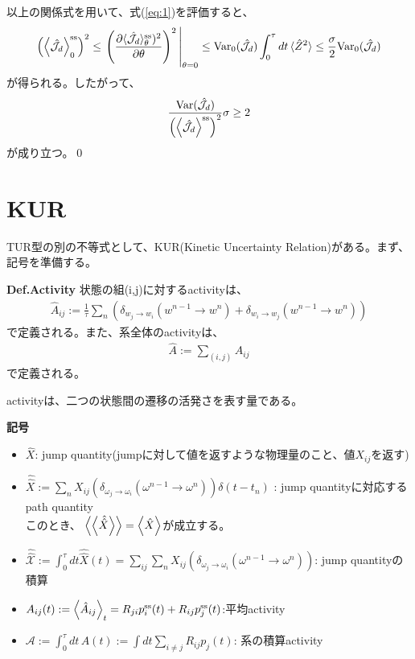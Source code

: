 \documentclass[a4paper,11pt]{jsarticle}
\numberwithin{equation}{section}
\begin{document}
以上の関係式を用いて、式(\ref{eq:1})を評価すると、
\begin{align}
    \qty(\ev{\hat{\mathcal{J}}_{d}}^{\text{ss}}_{0})^2\leq \eval{\left( \frac{\partial \langle {\hat{\mathcal{J}}_{d}} \rangle_\theta^{\text{ss}})^2}{\partial \theta} \right)^2}_{\theta = 0}
    \leq \mathrm{Var}_{0} (\hat{\mathcal{J}}_{d}) \int_0^\tau dt \, \langle \hat{Z}^2 \rangle \leq \frac{{\sigma}}{2} \mathrm{Var}_0 (\hat{\mathcal{J}}_{d})
\end{align}
が得られる。したがって、
\begin{align}
    \frac{\mathrm{Var}(\hat{\mathcal{J}}_{d})}{\qty(\ev{\hat{\mathcal{J}}_{d}}^{\text{ss}})^2} \sigma \geq 2
\end{align}
が成り立つ。\qed\\

\newpage
\section{KUR}
TUR型の別の不等式として、KUR(Kinetic Uncertainty Relation)がある。まず、記号を準備する。
\begin{itembox}[l]{\textbf{Def.Activity}}
    状態の組(i,j)に対するactivityは、
    \begin{align}
        \hat{A}_{ij} := \frac{1}{\tau} \sum_{n} \left( 
    \delta_{w_j \to w_i}(w^{n-1} \to w^n) + \delta_{w_i \to w_j}(w^{n-1} \to w^n) 
    \right)
    \end{align}
    で定義される。また、系全体のactivityは、
    \begin{align}
        \hat{A} := \sum_{(i,j)}  \hat{A}_{ij}
    \end{align}
    で定義される。
\end{itembox}
activityは、二つの状態間の遷移の活発さを表す量である。

\textbf{記号}
\begin{itemize}
    \item $\hat{X}$: jump quantity(jumpに対して値を返すような物理量のこと、値$X_{ij}$を返す)
    \item $\hat{\hat{X}} := \sum_{n} X_{ij}(\delta_{\omega_j \to \omega_{i}}(\omega^{n-1} \to \omega^{n})) \delta(t-t_n)$
    : jump quantityに対応するpath quantity\\
    このとき、 $\ev{\ev{\hat{\hat{X}}}}= \ev{\hat{X}}$が成立する。
    \item $\hat{\hat{\mathcal{X}}} := \int_{0}^{\tau} dt \hat{\hat{X}}(t)= \sum_{ij}\sum_{n}X_{ij}(\delta_{\omega_j \to \omega_{i}}(\omega^{n-1} \to \omega^{n}))$: jump quantityの積算
    \item $ A_{ij}(t) := \expval{\hat{A}_{ij}}_t = R_{ji} p_i^{\text{ss}}(t) + R_{ij} p_j^{\text{ss}}(t)$:平均activity
    \item $\mathcal{A} := \int_{0}^{\tau} dt \, A(t) := \int dt \sum_{i \neq j} R_{ij} p_j(t)$: 系の積算activity
\end{itemize}
\end{document}
